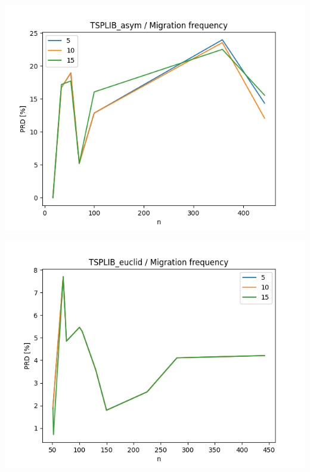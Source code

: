 \documentclass{article}
\begin{document}
\begin{center}
\includegraphics[width=\textwidth, 
                   height = 0.4\textheight, 
                   keepaspectratio]
                  {plots/tsplib_asym_11_migration_freq} 
\end{center}

\begin{center}
\includegraphics[width=\textwidth, 
                   height = 0.4\textheight, 
                   keepaspectratio]
                  {plots/tsplib_euclid_11_migration_freq} 
\end{center}
\end{document}
